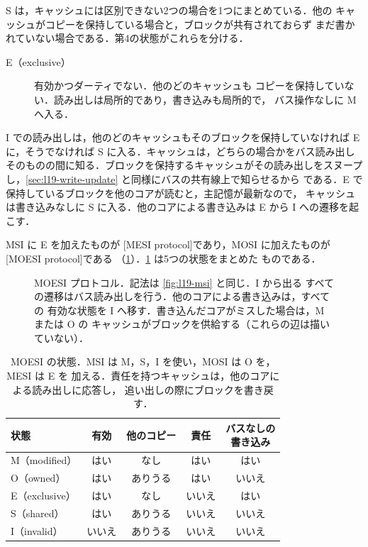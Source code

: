 \documentclass[../main.tex]{subfiles}
\begin{document}
S は，キャッシュには区別できない2つの場合を1つにまとめている．他の
キャッシュがコピーを保持している場合と，ブロックが共有されておらず
まだ書かれていない場合である．第4の状態がこれらを分ける．
\begin{description}
  \item[E（exclusive）] 有効かつダーティでない．他のどのキャッシュも
    コピーを保持していない．読み出しは局所的であり，書き込みも局所的で，
    バス操作なしに M へ入る．
\end{description}
I での読み出しは，他のどのキャッシュもそのブロックを保持していなければ E
に，そうでなければ S に入る．キャッシュは，どちらの場合かをバス読み出し
そのものの間に知る．ブロックを保持するキャッシュがその読み出しをスヌープ
し，\cref{sec:l19-write-update} と同様にバスの共有線上で知らせるから
である．E で保持しているブロックを他のコアが読むと，主記憶が最新なので，
キャッシュは書き込みなしに S に入る．他のコアによる書き込みは E から I
への遷移を起こす．

MSI に E を加えたものが %
[MESI protocol]であり，MOSI に加えたものが
[MOESI protocol]である
（\cref{fig:l19-moesi}）．\cref{tab:l19-states} は5つの状態をまとめた
ものである．

\begin{figure}[htbp]
  \centering
  
  \caption{MOESI プロトコル．記法は \cref{fig:l19-msi} と同じ．I から出る
    すべての遷移はバス読み出しを行う．他のコアによる書き込みは，すべての
    有効な状態を I へ移す．書き込んだコアがミスした場合は，M または O の
    キャッシュがブロックを供給する（これらの辺は描いていない）．}
  \label{fig:l19-moesi}
\end{figure}

\begin{table}[htbp]
  \centering\small
  \caption{MOESI の状態．MSI は M，S，I を使い，MOSI は O を，MESI は E を
    加える．責任を持つキャッシュは，他のコアによる読み出しに応答し，
    追い出しの際にブロックを書き戻す．}
  \label{tab:l19-states}
  \setlength{\tabcolsep}{4pt}
  \begin{tabular}{@{}lcccc@{}}
    \toprule
    状態 & 有効 & 他のコピー & 責任 & \shortstack{バスなしの\\書き込み} \\
    \midrule
    M（modified）  & はい   & なし     & はい   & はい \\
    O（owned）     & はい   & ありうる & はい   & いいえ \\
    E（exclusive） & はい   & なし     & いいえ & はい \\
    S（shared）    & はい   & ありうる & いいえ & いいえ \\
    I（invalid）   & いいえ & ありうる & いいえ & いいえ \\
    \bottomrule
  \end{tabular}
\end{table}
\end{document}
